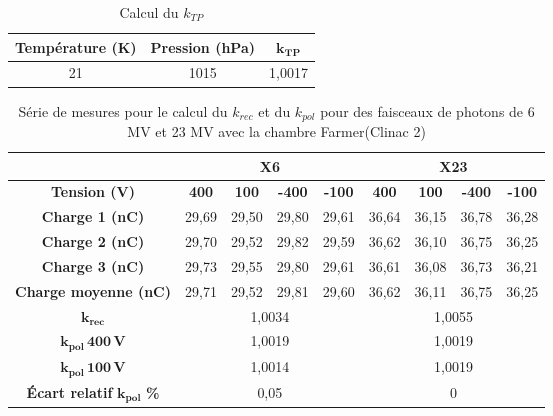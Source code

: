 \documentclass{article}
\begin{document}
\begin{table}[h]
  \centering
  \begin{tabular}{ccc}
    \toprule
    \textbf{Température (K)} & \textbf{Pression (hPa)} & $\mathbf{k_{TP}}$ \\
    \toprule
    21 & 1015 & 1,0017 \\
    \bottomrule
  \end{tabular}
  \caption{Calcul du $k_{TP}$}
  \label{table_ktp}
\end{table}


\begin{table}[h]
  \centering
  \begin{tabular}{c|cccc|cccc|}
  \cline{2-9}
                                                     & \multicolumn{4}{c|}{\textbf{X6}} & \multicolumn{4}{c|}{\textbf{X23}} \\ \hline
  \multicolumn{1}{|c|}{\textbf{Tension (V)}} & \textbf{400} & \textbf{100} & \textbf{-400} & \textbf{-100} & \textbf{400} & \textbf{100} & \textbf{-400} & \textbf{-100} \\ \hline
  \multicolumn{1}{|c|}{\textbf{Charge 1 (nC)}}       & 29,69  & 29,50  & 29,80  & 29,61 & 36,64  & 36,15  & 36,78  & 36,28  \\
  \multicolumn{1}{|c|}{\textbf{Charge 2 (nC)}}       & 29,70   & 29,52  & 29,82  & 29,59 & 36,62  & 36,10  & 36,75  & 36,25  \\
  \multicolumn{1}{|c|}{\textbf{Charge 3 (nC)}}       & 29,73  & 29,55  & 29,80  & 29,61 & 36,61  & 36,08  & 36,73  & 36,21  \\
  \multicolumn{1}{|c|}{\textbf{Charge moyenne (nC)}} & 29,71  & 29,52  & 29,81  & 29,60 & 36,62  & 36,11  & 36,75  & 36,25  \\ \hline
  \multicolumn{1}{|c|}{$\mathbf{k_{rec}}$}                & \multicolumn{4}{c|}{1,0034}      & \multicolumn{4}{c|}{1,0055}       \\
  \multicolumn{1}{|c|}{$\mathbf{k_{pol} \, 400 \, V}$}          & \multicolumn{4}{c|}{1,0019}      & \multicolumn{4}{c|}{1,0019}       \\
  \multicolumn{1}{|c|}{$\mathbf{k_{pol} \, 100 \, V}$}          & \multicolumn{4}{c|}{1,0014}      & \multicolumn{4}{c|}{1,0019}       \\ 
  \multicolumn{1}{|c|}{\textbf{Écart relatif} $\mathbf{k_{pol}}$ \textbf{\%}} & \multicolumn{4}{c|}{0,05} & \multicolumn{4}{c|}{0} \\
  \hline
  \end{tabular}
  \caption{Série de mesures pour le calcul du $k_{rec}$ et du $k_{pol}$ pour des faisceaux de photons de 6 MV et 23 MV avec la chambre Farmer(Clinac 2)}
  \label{table_kpol}
\end{table}
\end{document}
